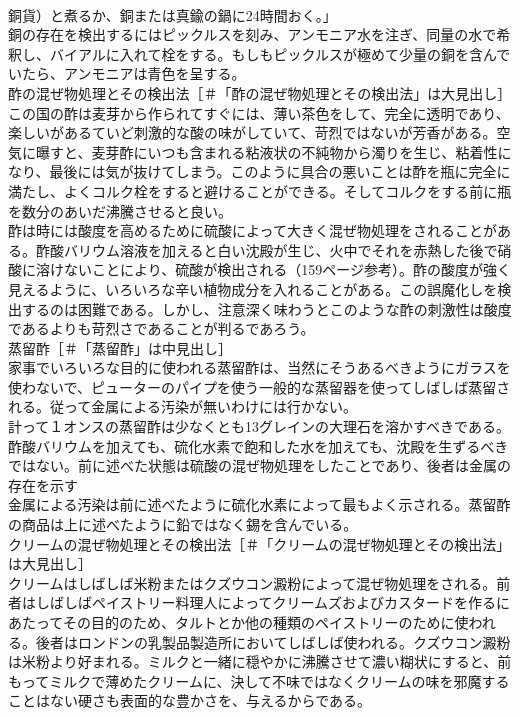\documentclass[8pt]{extreport}
\begin{document}
\begin{CJK}{UTF8}{min}
\\	銅貨）と煮るか、銅または真鍮の鍋に24時間おく。」
\\	銅の存在を検出するにはピックルスを刻み、アンモニア水を注ぎ、同量の水で希釈し、バイアルに入れて栓をする。もしもピックルスが極めて少量の銅を含んでいたら、アンモニアは青色を呈する。
\\	酢の混ぜ物処理とその検出法［＃「酢の混ぜ物処理とその検出法」は大見出し］
\\	この国の酢は麦芽から作られてすぐには、薄い茶色をして、完全に透明であり、楽しいがあるていど刺激的な酸の味がしていて、苛烈ではないが芳香がある。空気に曝すと、麦芽酢にいつも含まれる粘液状の不純物から濁りを生じ、粘着性になり、最後には気が抜けてしまう。このように具合の悪いことは酢を瓶に完全に満たし、よくコルク栓をすると避けることができる。そしてコルクをする前に瓶を数分のあいだ沸騰させると良い。
\\	酢は時には酸度を高めるために硫酸によって大きく混ぜ物処理をされることがある。酢酸バリウム溶液を加えると白い沈殿が生じ、火中でそれを赤熱した後で硝酸に溶けないことにより、硫酸が検出される（159ページ参考）。酢の酸度が強く見えるように、いろいろな辛い植物成分を入れることがある。この誤魔化しを検出するのは困難である。しかし、注意深く味わうとこのような酢の刺激性は酸度であるよりも苛烈さであることが判るであろう。
\\	蒸留酢［＃「蒸留酢」は中見出し］
\\	家事でいろいろな目的に使われる蒸留酢は、当然にそうあるべきようにガラスを使わないで、ピューターのパイプを使う一般的な蒸留器を使ってしばしば蒸留される。従って金属による汚染が無いわけには行かない。
\\	計って１オンスの蒸留酢は少なくとも13グレインの大理石を溶かすべきである。
\\	酢酸バリウムを加えても、硫化水素で飽和した水を加えても、沈殿を生ずるべきではない。前に述べた状態は硫酸の混ぜ物処理をしたことであり、後者は金属の存在を示す
\\	金属による汚染は前に述べたように硫化水素によって最もよく示される。蒸留酢の商品は上に述べたように鉛ではなく錫を含んでいる。
\\	クリームの混ぜ物処理とその検出法［＃「クリームの混ぜ物処理とその検出法」は大見出し］
\\	クリームはしばしば米粉またはクズウコン澱粉によって混ぜ物処理をされる。前者はしばしばペイストリー料理人によってクリームズおよびカスタードを作るにあたってその目的のため、タルトとか他の種類のペイストリーのために使われる。後者はロンドンの乳製品製造所においてしばしば使われる。クズウコン澱粉は米粉より好まれる。ミルクと一緒に穏やかに沸騰させて濃い糊状にすると、前もってミルクで薄めたクリームに、決して不味ではなくクリームの味を邪魔することはない硬さも表面的な豊かさを、与えるからである。

\end{CJK}
\end{document}
